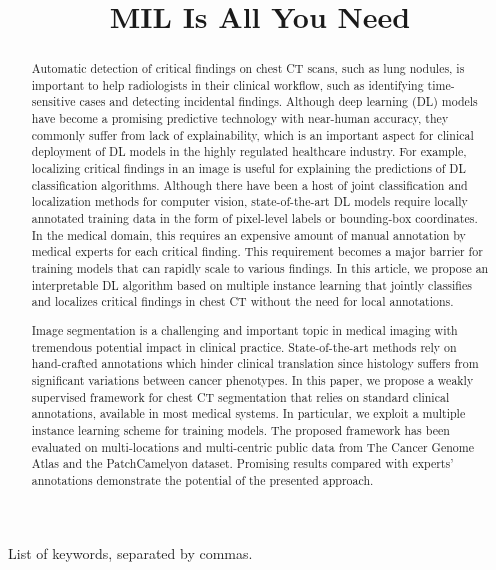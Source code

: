 \documentclass{midl} %
\title[MIL Is All You Need]{MIL Is All You Need}
\begin{document}
\maketitle

\begin{abstract}
Automatic detection of critical findings on chest CT scans, such as lung nodules, is important to help radiologists in their clinical workflow, such as identifying time-sensitive cases and detecting incidental findings. Although deep learning (DL) models have become a promising predictive technology with near-human accuracy, they commonly suffer from lack of explainability, which is an important aspect for clinical deployment of DL models in the highly regulated healthcare industry. For example, localizing critical findings in an image is useful for explaining the predictions of DL classification algorithms. Although there have been a host of joint classification and localization methods for computer vision, state-of-the-art DL models require locally annotated training data in the form of pixel-level labels or bounding-box coordinates. In the medical domain, this requires an expensive amount of manual annotation by medical experts for each critical finding. This requirement becomes a major barrier for training models that can rapidly scale to various findings. In this article, we propose an interpretable DL algorithm based on multiple instance learning that jointly classifies and localizes critical findings in chest CT without the need for local annotations.

Image segmentation is a challenging and important topic in medical imaging with tremendous potential impact in clinical practice. State-of-the-art methods rely on hand-crafted annotations which hinder clinical translation since histology suffers from significant variations between cancer phenotypes. In this paper, we propose a weakly supervised framework for chest CT segmentation that relies on standard clinical annotations, available in most medical systems. In particular, we exploit a multiple instance learning scheme for training models. The proposed framework has been evaluated on multi-locations and multi-centric public data from The Cancer Genome Atlas and the PatchCamelyon dataset. Promising results compared with experts' annotations demonstrate the potential of the presented approach.
\end{abstract}

\begin{keywords}
List of keywords, separated by commas.
\end{keywords}
\end{document}
